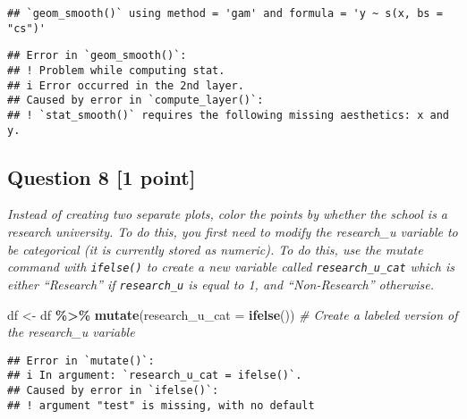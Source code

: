 \documentclass[
]{article}
\newenvironment{Shaded}{\begin{snugshade}}{\end{snugshade}}
\newcommand{\AttributeTok}[1]{\textcolor[rgb]{0.13,0.29,0.53}{#1}}
\newcommand{\CommentTok}[1]{\textcolor[rgb]{0.56,0.35,0.01}{\textit{#1}}}
\newcommand{\FunctionTok}[1]{\textcolor[rgb]{0.13,0.29,0.53}{\textbf{#1}}}
\newcommand{\NormalTok}[1]{#1}
\newcommand{\OtherTok}[1]{\textcolor[rgb]{0.56,0.35,0.01}{#1}}
\newcommand{\SpecialCharTok}[1]{\textcolor[rgb]{0.81,0.36,0.00}{\textbf{#1}}}
\begin{document}
\begin{verbatim}
## `geom_smooth()` using method = 'gam' and formula = 'y ~ s(x, bs = "cs")'
\end{verbatim}

\begin{verbatim}
## Error in `geom_smooth()`:
## ! Problem while computing stat.
## i Error occurred in the 2nd layer.
## Caused by error in `compute_layer()`:
## ! `stat_smooth()` requires the following missing aesthetics: x and y.
\end{verbatim}

\subsection{Question 8 {[}1 point{]}}\label{question-8-1-point}

\emph{Instead of creating two separate plots, color the points by
whether the school is a research university. To do this, you first need
to modify the research\_u variable to be categorical (it is currently
stored as numeric). To do this, use the mutate command with
\texttt{ifelse()} to create a new variable called
\texttt{research\_u\_cat} which is either ``Research'' if
\texttt{research\_u} is equal to 1, and ``Non-Research'' otherwise.}

\begin{Shaded}
\begin{Highlighting}[]
\NormalTok{df }\OtherTok{\textless{}{-}}\NormalTok{ df }\SpecialCharTok{\%\textgreater{}\%}
  \FunctionTok{mutate}\NormalTok{(}\AttributeTok{research\_u\_cat =} \FunctionTok{ifelse}\NormalTok{()) }\CommentTok{\# Create a labeled version of the research\_u variable}
\end{Highlighting}
\end{Shaded}

\begin{verbatim}
## Error in `mutate()`:
## i In argument: `research_u_cat = ifelse()`.
## Caused by error in `ifelse()`:
## ! argument "test" is missing, with no default
\end{verbatim}
\end{document}
